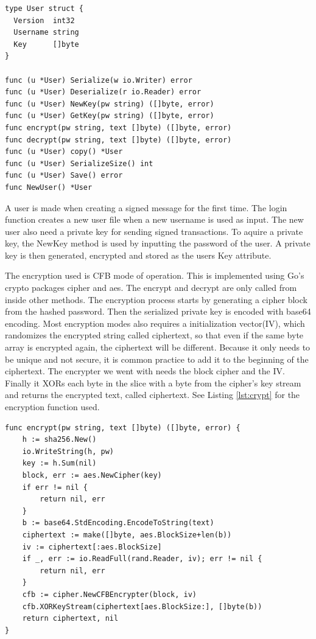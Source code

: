 \documentclass[12pt]{article}
\begin{document}
\begin{lstlisting}[float=h!,caption={User},label=lst:user]
type User struct {
  Version  int32
  Username string
  Key      []byte
}

func (u *User) Serialize(w io.Writer) error 
func (u *User) Deserialize(r io.Reader) error 
func (u *User) NewKey(pw string) ([]byte, error)
func (u *User) GetKey(pw string) ([]byte, error) 
func encrypt(pw string, text []byte) ([]byte, error) 
func decrypt(pw string, text []byte) ([]byte, error) 
func (u *User) copy() *User 
func (u *User) SerializeSize() int 
func (u *User) Save() error 
func NewUser() *User 
\end{lstlisting}

A user is made when creating a signed message for the first time. The login function creates a new user file when a new username is used as input. The new user also need a private key for sending signed transactions. To aquire a private key, the NewKey method is used by inputting the password of the user. A private key is then generated, encrypted and stored as the users Key attribute. 

The encryption used is CFB mode of operation. This is implemented using Go's crypto packages cipher and aes. The encrypt and decrypt are only called from inside other methods. The encryption process starts by generating a cipher block from the hashed password. Then the serialized private key is encoded with base64 encoding. Most encryption modes also requires a initialization vector(IV), which randomizes the encrypted string called ciphertext, so that even if the same byte array is encrypted again, the ciphertext will be different. Because it only needs to be unique and not secure, it is common practice to add it to the beginning of the ciphertext. The encrypter we went with needs the block cipher and the IV. Finally it XORs each byte in the slice with a byte from the cipher's key stream and returns the encrypted text, called ciphertext. See Listing \ref{lst:crypt} for the encryption function used.

\begin{lstlisting}[float=h!,caption={Encryption},label=lst:crypt]
func encrypt(pw string, text []byte) ([]byte, error) {
	h := sha256.New()
	io.WriteString(h, pw)
	key := h.Sum(nil)
	block, err := aes.NewCipher(key)
	if err != nil {
		return nil, err
	}
	b := base64.StdEncoding.EncodeToString(text)
	ciphertext := make([]byte, aes.BlockSize+len(b))
	iv := ciphertext[:aes.BlockSize]
	if _, err := io.ReadFull(rand.Reader, iv); err != nil {
		return nil, err
	}
	cfb := cipher.NewCFBEncrypter(block, iv)
	cfb.XORKeyStream(ciphertext[aes.BlockSize:], []byte(b))
	return ciphertext, nil
}
\end{lstlisting}
\end{document}
